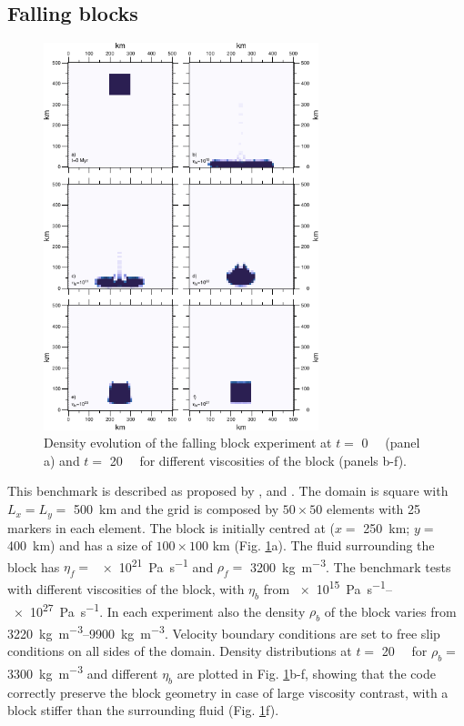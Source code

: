 \subsection{Falling blocks}\label{sec:block}

\begin{figure}
\includegraphics[width=8cm]{./Figures/Block.pdf}
\caption{Density evolution of the falling block experiment at $t=$ \SI{0}{\mega\year} (panel a) and $t=$ \SI{20}{\mega\year} for different viscosities of the
block (panels b-f).}
\label{fig:block}
\end{figure}
This benchmark is described as proposed by \citet{Gerya2003a}, \citet{Gerya2010} and \citet{Thieulot2011}. The domain is square with $L_x=L_y=$ \SI{500}{\km} and the grid is composed by $50\times50$ elements with 25 markers in each element.
The block is initially centred at ($x=$ \SI{250}{\km}; $y=$ \SI{400}{\km}) and has a size of $100\times100$ km (Fig. \ref{fig:block}a). The fluid surrounding the block has $\eta_f=$ \SI{e21}{\pascal\per\s} and $\rho_f=$ \SI{3200}{\kg\per\cubic\m}. The benchmark tests with different viscosities of the block, with $\eta_b$ from \SIrange{e15}{e27}{\pascal\per\s}. In each experiment also the density $\rho_b$ of the block varies from \SIrange{3220}{9900}{\kg\per\cubic\m}. Velocity boundary conditions are set to free slip conditions on all sides of the domain. Density distributions at $t=$ \SI{20}{\mega\year} for $\rho_b=$ \SI{3300}{\kg\per\cubic\m} and different $\eta_b$ are plotted in Fig. \ref{fig:block}b-f, showing that the code correctly preserve the block geometry in case of large viscosity contrast, with a block stiffer than the surrounding fluid (Fig. \ref{fig:block}f).

